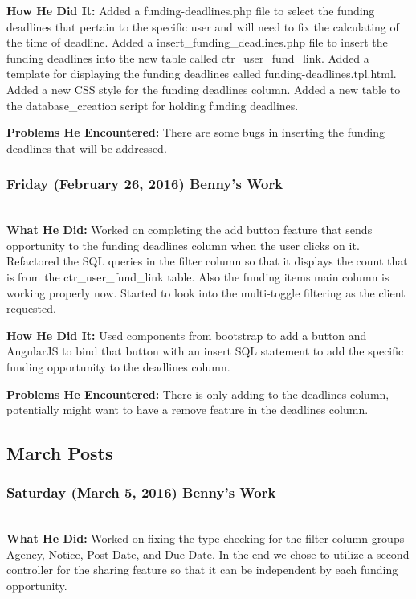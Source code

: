 \documentclass[onecolumn]{IEEEtran}
\begin{document}
	\textbf{How He Did It: }
	Added a funding-deadlines.php file to select the funding deadlines that pertain to the specific user and will need to fix the calculating of the time of deadline. Added a insert\_funding\_deadlines.php file to insert the funding deadlines into the new table called ctr\_user\_fund\_link. Added a template for displaying the funding deadlines called funding-deadlines.tpl.html. Added a new CSS style for the funding deadlines column. Added a new table to the database\_creation script for holding funding deadlines. 
    
	\textbf{Problems He Encountered: }
	There are some bugs in inserting the funding deadlines that will be addressed. 

\subsubsection{Friday (February 26, 2016) Benny's Work  } \hspace*{\fill} \\
    \textbf{What He Did: } 
    Worked on completing the add button feature that sends opportunity to the funding deadlines column when the user clicks on it. Refactored the SQL queries in the filter column so that it displays the count that is from the ctr\_user\_fund\_link table. Also the funding items main column is working properly now. Started to look into the multi-toggle filtering as the client requested. 
    
	\textbf{How He Did It: }
	Used components from bootstrap to add a button and AngularJS to bind that button with an insert SQL statement to add the specific funding opportunity to the deadlines column. 
    
	\textbf{Problems He Encountered: }
	There is only adding to the deadlines column, potentially might want to have a remove feature in the deadlines column. 

\subsection{March Posts}
\subsubsection{Saturday (March 5, 2016) Benny's Work  } \hspace*{\fill} \\
    \textbf{What He Did: } 
    Worked on fixing the type checking for the filter column groups Agency, Notice, Post Date, and Due Date. In the end we chose to utilize a second controller for the sharing feature so that it can be independent by each funding opportunity. 
    
\end{document}

